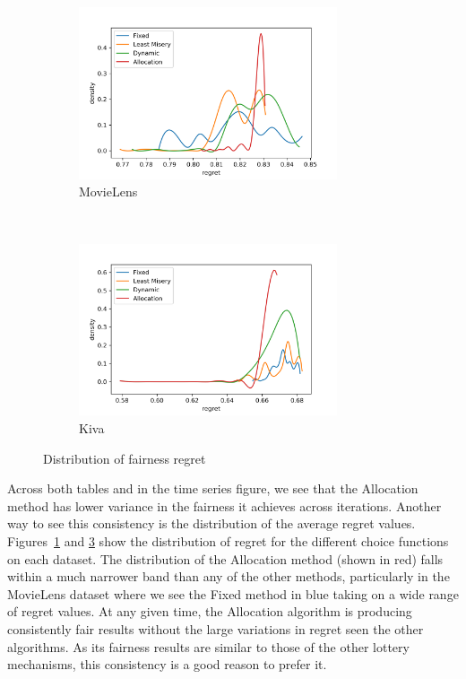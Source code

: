 \begin{figure}[t!]
    \centering
    \begin{subfigure}[t]{0.5\textwidth}
        \centering
        \includegraphics[width=3.0in]{imgs/dynfair/ML_regret_variance_sep20.png}
        \caption{MovieLens}
        \label{fig:local-regret-ML}
    \end{subfigure}%
    ~ 
    \begin{subfigure}[t]{0.5\textwidth}
        \centering
        \includegraphics[width=3.0in]{imgs/dynfair/kiva_regret_variance_sep20.png}
        \caption{Kiva}
        \label{fig:local-regret-Kiva}
    \end{subfigure}
    \caption{Distribution of fairness regret}
\end{figure}

Across both tables and in the time series figure, we see that the Allocation method has  lower variance in the fairness it achieves across iterations. Another way to see this consistency is the distribution of the average regret values. Figures~\ref{fig:local-regret-ML} and \ref{fig:local-regret-Kiva} show the distribution of regret for the different choice functions on each dataset. The distribution of the Allocation method (shown in red) falls within a much narrower band than any of the other methods, particularly in the MovieLens dataset where we see the Fixed method in blue taking on a wide range of regret values. At any given time, the Allocation algorithm is producing consistently fair results without the large variations in regret seen the other algorithms. As its fairness results are similar to those of the other lottery mechanisms, this consistency is a good reason to prefer it.

